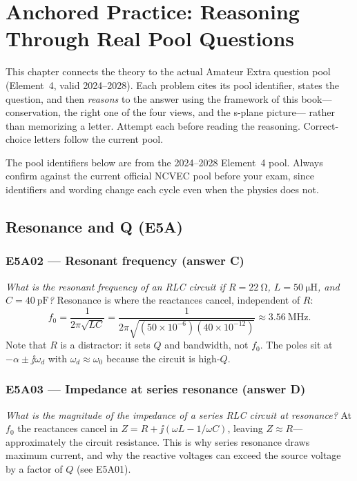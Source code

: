 \chapter{Anchored Practice: Reasoning Through Real Pool Questions}
\label{ch:practice}
This chapter connects the theory to the actual Amateur Extra question pool
(Element~4, valid 2024--2028). Each problem cites its pool identifier, states the
question, and then \emph{reasons} to the answer using the framework of this
book---conservation, the right one of the four views, and the s-plane picture---
rather than memorizing a letter. Attempt each before reading the reasoning.
Correct-choice letters follow the current pool.

\begin{exambox}
The pool identifiers below are from the 2024--2028 Element~4 pool. Always confirm
against the current official NCVEC pool before your exam, since identifiers and
wording change each cycle even when the physics does not.
\end{exambox}

\section{Resonance and Q (E5A)}

\subsection*{E5A02 --- Resonant frequency (answer C)}
\emph{What is the resonant frequency of an RLC circuit if \(R=\SI{22}{\ohm}\),
\(L=\SI{50}{\micro\henry}\), and \(C=\SI{40}{\pico\farad}\)?}
Resonance is where the reactances cancel, independent of \(R\):
\[
f_0=\frac{1}{2\pi\sqrt{LC}}
=\frac{1}{2\pi\sqrt{(50\times10^{-6})(40\times10^{-12})}}
\approx\SI{3.56}{\mega\hertz}.
\]
Note that \(R\) is a distractor: it sets \(Q\) and bandwidth, not \(f_0\). The
poles sit at \(-\alpha\pm\jj\omega_d\) with \(\omega_d\approx\omega_0\) because the
circuit is high-\(Q\).

\subsection*{E5A03 --- Impedance at series resonance (answer D)}
\emph{What is the magnitude of the impedance of a series RLC circuit at
resonance?} At \(f_0\) the reactances cancel in \(Z=R+\jj(\omega L-1/\omega C)\),
leaving \(Z\approx R\)---approximately the circuit resistance. This is why series
resonance draws maximum current, and why the reactive voltages can exceed the
source voltage by a factor of \(Q\) (see E5A01).


